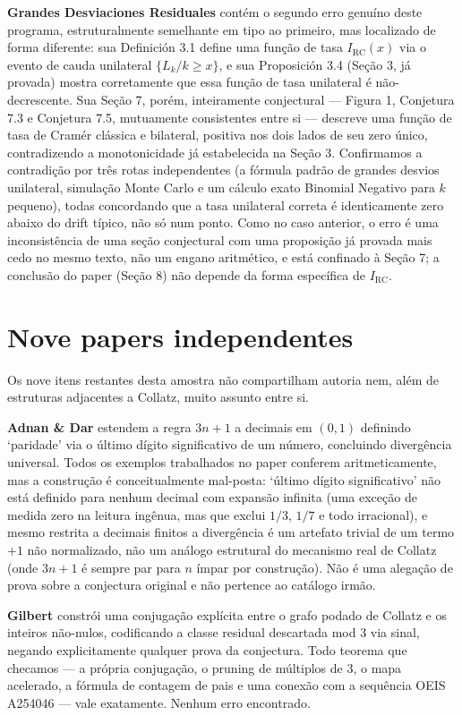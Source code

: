 \documentclass[11pt]{article}
\begin{document}
\textbf{Grandes Desviaciones Residuales} \cite{RuizCastillo2026g}
contém o segundo erro genuíno deste programa, estruturalmente
semelhante em tipo ao primeiro, mas localizado de forma diferente: sua
Definición 3.1 define uma função de tasa $I_{\mathrm{RC}}(x)$ via o
evento de cauda unilateral $\{L_k/k \ge x\}$, e sua Proposición 3.4
(Seção 3, já provada) mostra corretamente que essa função de tasa
unilateral é não-decrescente. Sua Seção 7, porém, inteiramente
conjectural --- Figura 1, Conjetura 7.3 e Conjetura 7.5, mutuamente
consistentes entre si --- descreve uma função de tasa de Cramér
clássica e bilateral, positiva nos dois lados de seu zero único,
contradizendo a monotonicidade já estabelecida na Seção 3. Confirmamos
a contradição por três rotas independentes (a fórmula padrão de
grandes desvios unilateral, simulação Monte Carlo e um cálculo exato
Binomial Negativo para $k$ pequeno), todas concordando que a tasa
unilateral correta é identicamente zero abaixo do drift típico, não só
num ponto. Como no caso anterior, o erro é uma inconsistência de uma
seção conjectural com uma proposição já provada mais cedo no mesmo
texto, não um engano aritmético, e está confinado à Seção 7; a
conclusão do paper (Seção 8) não depende da forma específica de
$I_{\mathrm{RC}}$.

\section{Nove papers independentes}
\label{sec:others}

Os nove itens restantes desta amostra não compartilham autoria nem,
além de estruturas adjacentes a Collatz, muito assunto entre si.

\textbf{Adnan \& Dar} \cite{AdnanDar2026} estendem a regra $3n+1$ a
decimais em $(0,1)$ definindo `paridade' via o último dígito
significativo de um número, concluindo divergência universal. Todos os
exemplos trabalhados no paper conferem aritmeticamente, mas a
construção é conceitualmente mal-posta: `último dígito significativo'
não está definido para nenhum decimal com expansão infinita (uma
exceção de medida zero na leitura ingênua, mas que exclui $1/3$, $1/7$
e todo irracional), e mesmo restrita a decimais finitos a divergência é
um artefato trivial de um termo $+1$ não normalizado, não um análogo
estrutural do mecanismo real de Collatz (onde $3n+1$ é sempre par para
$n$ ímpar por construção). Não é uma alegação de prova sobre a
conjectura original e não pertence ao catálogo irmão.

\textbf{Gilbert} \cite{Gilbert2026} constrói uma conjugação explícita
entre o grafo podado de Collatz e os inteiros não-nulos, codificando a
classe residual descartada mod 3 via sinal, negando explicitamente
qualquer prova da conjectura. Todo teorema que checamos --- a própria
conjugação, o pruning de múltiplos de 3, o mapa acelerado, a fórmula de
contagem de pais e uma conexão com a sequência OEIS A254046 --- vale
exatamente. Nenhum erro encontrado.
\end{document}
